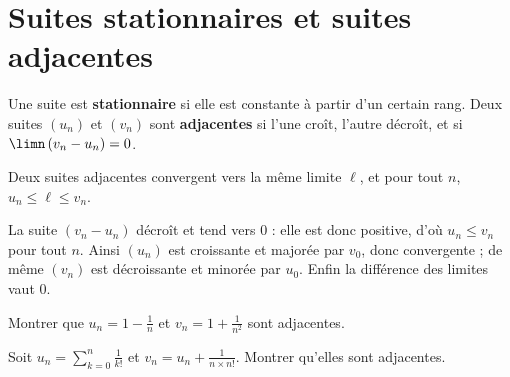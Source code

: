 \section{Suites stationnaires et suites adjacentes}

\begin{definition}
Une suite est \textbf{stationnaire} si elle est constante à partir d'un
certain rang. Deux suites $(u_{n})$ et $(v_{n})$ sont \textbf{adjacentes} si
l'une croît, l'autre décroît, et si $\limn\left(v_{n}-u_{n}\right) = 0$.
\end{definition}

\begin{theoreme}
Deux suites adjacentes convergent vers la même limite $\ell$, et pour tout
$n$, $u_{n} \leq \ell \leq v_{n}$.
\end{theoreme}

\begin{demonstration}
La suite $(v_{n}-u_{n})$ décroît et tend vers $0$ : elle est donc positive,
d'où $u_{n} \leq v_{n}$ pour tout $n$. Ainsi $(u_{n})$ est croissante et
majorée par $v_{0}$, donc convergente ; de même $(v_{n})$ est décroissante et
minorée par $u_{0}$. Enfin la différence des limites vaut $0$.
\end{demonstration}

\begin{entrainement}
\exo[\niveau{2}] Montrer que $u_{n} = 1-\frac1n$ et $v_{n} = 1+\frac{1}{n^{2}}$
sont adjacentes.

\exo[\niveau{3}] Soit $u_{n} = \displaystyle\sum_{k=0}^{n}\frac{1}{k!}$ et
$v_{n} = u_{n}+\frac{1}{n\times n!}$. Montrer qu'elles sont adjacentes.
\end{entrainement}

